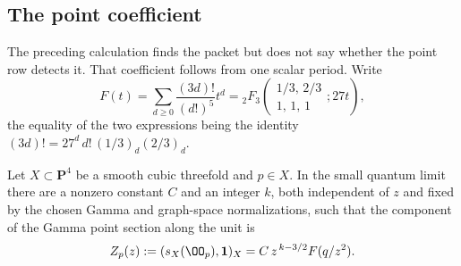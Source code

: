 \subsection{The point coefficient}

The preceding calculation finds the packet but does not say whether the
point row detects it.  That coefficient follows from one scalar period.  Write
\begin{equation}\label{eq:cubic-quantum-period}
 F(t)=\sum_{d\geq0}\frac{(3d)!}{(d!)^5}t^d
 ={}_2F_3\!\left(
   \begin{matrix}1/3,\,2/3\\1,\,1,\,1\end{matrix};27t
 \right),
\end{equation}
the equality of the two expressions being the identity
\((3d)!=27^d\,d!\,(1/3)_d(2/3)_d\).

\begin{lemma}
\label{lem:cubic-central-charge}
Let \(X\subset\mathbf P^4\) be a smooth cubic threefold and \(p\in X\).  In
the small quantum limit there are a nonzero constant \(C\) and an integer
\(k\), both independent of \(z\) and fixed by the chosen Gamma and
graph-space normalizations, such that the component of the Gamma point
section along the unit is
\begin{equation}\label{eq:cubic-point-central-charge}
 Z_p(z):=(s_X(\OO_p),\mathbf 1)_X
 =C\,z^{\,k-3/2}F(q/z^2).
\end{equation}
\end{lemma}

